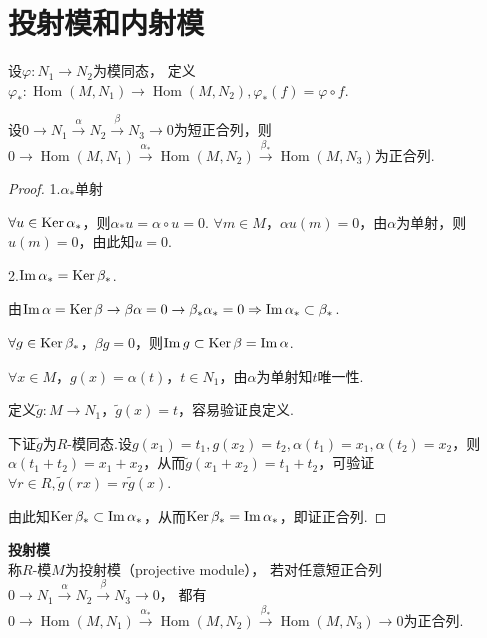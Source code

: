 \section{投射模和内射模}
 \begin{definition}
    设$\varphi:N_1\rightarrow N_2$为模同态，
    定义$\varphi_*:\operatorname{Hom}(M,N_1)\rightarrow 
    \operatorname{Hom}(M,N_2),\varphi_*(f)=\varphi\circ f$.
\end{definition}
    \begin{proposition}
        设$0\rightarrow N_1\xrightarrow{\alpha}N_2\xrightarrow{\beta}N_3
        \rightarrow0$为短正合列，则$0\rightarrow \operatorname{Hom}(M,N_1)
        \xrightarrow{\alpha_*}\operatorname{Hom}(M,N_2)
        \xrightarrow{\beta_*}\operatorname{Hom}(M,N_3)$为正合列.
    \end{proposition}
\begin{proof}
1.$\alpha_*$单射

$\forall u\in \operatorname{Ker}\alpha_*$，则$\alpha_* u=\alpha\circ u=0$.
$\forall m\in M$，$\alpha u(m)=0$，由$\alpha$为单射，则$u(m)=0$，由此知$u=0$.

2.$\operatorname{Im}\alpha_*=\operatorname{Ker}\beta_*$.

由$\operatorname{Im}\alpha=\operatorname{Ker}\beta \rightarrow\beta \alpha=0\rightarrow \beta_*\alpha_*=0
\Rightarrow \operatorname{Im}\alpha_*\subset \beta_*$.

$\forall g \in \operatorname{Ker}\beta_*$，$\beta g=0$，则$\operatorname{Im} g \subset \operatorname{Ker}\beta =\operatorname{Im}\alpha$.

$\forall x \in M$，$g(x)=\alpha(t)$，$t\in N_1$，由$\alpha$为单射知$t$唯一性.

定义$\tilde{g}:M\rightarrow N_1$，$\tilde{g}(x)=t$，容易验证良定义.

下证$\tilde{g}$为$R$-模同态.设$g(x_1)=t_1,g(x_2)=t_2,\alpha(t_1)=x_1,\alpha(t_2)=x_2$，则$\alpha(t_1+t_2)=x_1+x_2$，从而$\tilde{g}(x_1+x_2)=t_1+t_2$，可验证$\forall r \in R,\tilde g(rx)=r\tilde{g}(x)$.

由此知$\operatorname{Ker}\beta_*\subset \operatorname{Im}\alpha_*$，从而$\operatorname{Ker}\beta_*= \operatorname{Im}\alpha_*$，即证正合列.
\end{proof}
    \begin{definition}\textbf{投射模}\\
        称$R$-模$M$为投射模（projective module），
        若对任意短正合列$0\rightarrow N_1\xrightarrow{\alpha}N_2
        \xrightarrow{\beta}N_3\rightarrow0$，
        都有$0\rightarrow \operatorname{Hom}(M,N_1)
        \xrightarrow{\alpha_*}\operatorname{Hom}(M,N_2)
        \xrightarrow{\beta_*}\operatorname{Hom}(M,N_3)\rightarrow0$为正合列.
    \end{definition}

